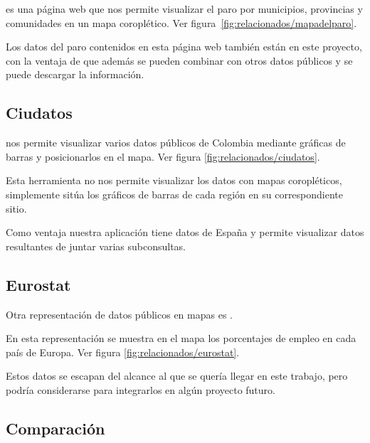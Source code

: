  es una página web que nos permite visualizar el paro por municipios, provincias y comunidades en un mapa coroplético. Ver figura~\ref{fig:relacionados/mapadelparo}.

Los datos del paro contenidos en esta página web también están en este proyecto, con la ventaja de que además se pueden combinar con otros datos públicos y se puede descargar la información.


\subsection{Ciudatos}

 nos permite visualizar varios datos públicos de Colombia mediante gráficas de barras y posicionarlos en el mapa. Ver figura \ref{fig:relacionados/ciudatos}.

Esta herramienta no nos permite visualizar los datos con mapas coropléticos, simplemente sitúa los gráficos de barras de cada región en su correspondiente sitio.

Como ventaja nuestra aplicación tiene datos de España y permite visualizar datos resultantes de juntar varias subconsultas.


\subsection{Eurostat}

Otra representación de datos públicos en mapas es .

En esta representación se muestra en el mapa los porcentajes de empleo en cada país de Europa. Ver figura \ref{fig:relacionados/eurostat}.

Estos datos se escapan del alcance al que se quería llegar en este trabajo, pero podría considerarse para integrarlos en algún proyecto futuro.


\subsection{Comparación}

